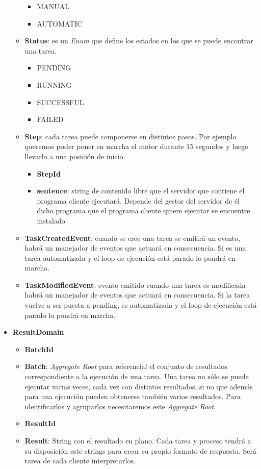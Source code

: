 \begin{itemize}
\begin{itemize}
        \begin{itemize}
            \item MANUAL
            \item AUTOMATIC
        \end{itemize}
        \item \textbf{Status}: es un \textit{Enum} que define los estados en los que se puede encontrar una tarea.
        \begin{itemize}
            \item PENDING
            \item RUNNING
            \item SUCCESSFUL
            \item FAILED
        \end{itemize}
        \item \textbf{Step}: cada tarea puede componerse en distintos pasos.
        Por ejemplo queremos poder poner en marcha el motor durante 15 segundos y luego llevarlo a una posición de inicio.
        \begin{itemize}
            \item \textbf{StepId}
            \item \textbf{sentence}: string de contenido libre que el servidor que contiene el programa cliente ejecutará.
            Depende del gestor del servidor de él dicho programa que el programa cliente quiere ejecutar se encuentre instalado
        \end{itemize}
        \item \textbf{TaskCreatedEvent}: cuando se cree una tarea se emitirá un evento, habrá un manejador de eventos que actuará en consecuencia.
        Si es una tarea automatizada y el loop de ejecución está parado lo pondrá en marcha.
        \item \textbf{TaskModifiedEvent}: evento emitido cuando una tarea es modificada habrá un manejador de eventos que actuará en consecuencia.
        Si la tarea vuelve a ser puesta a pending, es automatizada y el loop de ejecución está parado lo pondrá en marcha.
    \end{itemize}
    \item \textbf{ResultDomain}
    \begin{itemize}
        \item \textbf{BatchId}
        \item \textbf{Batch}: \textit{Aggregate Root} para referencial el conjunto de resultados correspondiente a la ejecución de una tarea.
        Una tarea no sólo se puede ejecutar varias veces, cada vez con distintos resultados, si no que además para una ejecución pueden obtenerse también varios resultados.
        Para identificarlos y agruparlos necesitaremos este \textit{Aggregate Root}.
        \item \textbf{ResultId}
        \item \textbf{Result}: String con el resultado en plano.
        Cada tarea y proceso tendrá a su disposición este strings para crear su propio formato de respuesta.
        Será tarea de cada cliente interpretarlos.
    \end{itemize}
\end{itemize}

